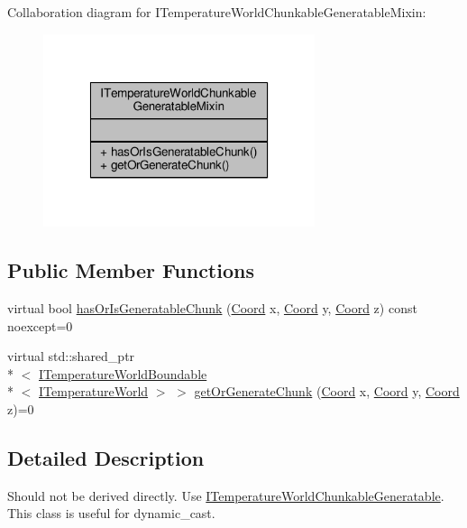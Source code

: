 Collaboration diagram for I\-Temperature\-World\-Chunkable\-Generatable\-Mixin\-:
\nopagebreak
\begin{figure}[H]
\begin{center}
\leavevmode
\includegraphics[width=226pt]{class_i_temperature_world_chunkable_generatable_mixin__coll__graph}
\end{center}
\end{figure}
\subsection*{Public Member Functions}
\begin{DoxyCompactItemize}
\item 
virtual bool \hyperlink{class_i_temperature_world_chunkable_generatable_mixin_a015be90684c10d61cc962439b3ed71ef}{has\-Or\-Is\-Generatable\-Chunk} (\hyperlink{struct_coord}{Coord} x, \hyperlink{struct_coord}{Coord} y, \hyperlink{struct_coord}{Coord} z) const noexcept=0
\item 
virtual std\-::shared\-\_\-ptr\\*
$<$ \hyperlink{class_i_temperature_world_boundable}{I\-Temperature\-World\-Boundable}\\*
$<$ \hyperlink{class_i_temperature_world}{I\-Temperature\-World} $>$ $>$ \hyperlink{class_i_temperature_world_chunkable_generatable_mixin_a1144edcb06ba318422be96ee5f8b139d}{get\-Or\-Generate\-Chunk} (\hyperlink{struct_coord}{Coord} x, \hyperlink{struct_coord}{Coord} y, \hyperlink{struct_coord}{Coord} z)=0
\end{DoxyCompactItemize}


\subsection{Detailed Description}
Should not be derived directly. Use {\ttfamily \hyperlink{class_i_temperature_world_chunkable_generatable}{I\-Temperature\-World\-Chunkable\-Generatable}}. This class is useful for {\ttfamily dynamic\-\_\-cast}. 

